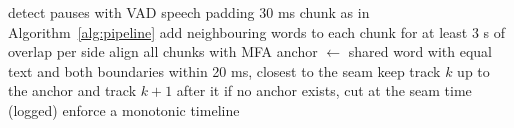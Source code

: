 \begin{algorithm}[t]
\caption{Overlap-and-stitch for long recordings}
\label{alg:stitch}
\begin{algorithmic}[1]
\State detect pauses with VAD speech padding 30 ms
\State chunk as in Algorithm~\ref{alg:pipeline}
\State add neighbouring words to each chunk for at least 3 s of overlap per side
\State align all chunks with MFA
  \State anchor $\gets$ shared word with equal text and both boundaries within 20 ms, closest to the seam
  \State keep track $k$ up to the anchor and track $k{+}1$ after it
  \State if no anchor exists, cut at the seam time (logged)
\EndFor
\State enforce a monotonic timeline
\end{algorithmic}
\end{algorithm}
